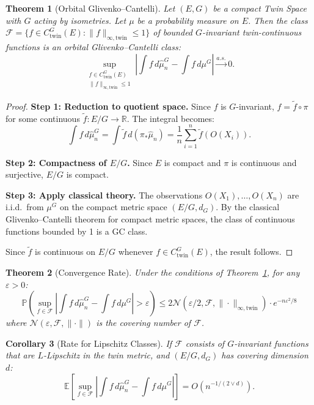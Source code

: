 \documentclass[11pt,twoside,openright]{book}
\theoremstyle{plain}
\newtheorem{theorem}{Theorem}[chapter]
\newtheorem{corollary}[theorem]{Corollary}
\theoremstyle{definition}
\theoremstyle{remark}
\newcommand{\calF}{\mathcal{F}}
\newcommand{\calN}{\mathcal{N}}
\newcommand{\Rd}{\mathbb{R}}
\newcommand{\norm}[1]{\|#1\|}
\newcommand{\abs}[1]{|#1|}
\newcommand{\E}{\mathbb{E}}
\newcommand{\Prob}{\mathbb{P}}
\begin{document}
\begin{theorem}[Orbital Glivenko--Cantelli]
\label{thm:GC}
Let $(E, G)$ be a compact Twin Space with $G$ acting by isometries. Let $\mu$ be a probability measure on $E$. Then the class $\calF = \{f \in C_{\text{twin}}^G(E) : \norm{f}_{\infty,\text{twin}} \leq 1\}$ of bounded $G$-invariant twin-continuous functions is an orbital Glivenko--Cantelli class:
\[
\sup_{\substack{f \in C_{\text{twin}}^G(E)\\ \norm{f}_{\infty,\text{twin}} \leq 1}} \abs{\int f \, d\hat{\mu}_n^G - \int f \, d\mu^G} \xrightarrow{a.s.} 0.
\]
\end{theorem}

\begin{proof}
\textbf{Step 1: Reduction to quotient space.} Since $f$ is $G$-invariant, $f = \tilde{f} \circ \pi$ for some continuous $\tilde{f} : E/G \to \Rd$. The integral becomes:
\[
\int f \, d\hat{\mu}_n^G = \int \tilde{f} \, d(\pi_* \hat{\mu}_n) = \frac{1}{n} \sum_{i=1}^n \tilde{f}(O(X_i)).
\]

\textbf{Step 2: Compactness of $E/G$.} Since $E$ is compact and $\pi$ is continuous and surjective, $E/G$ is compact.

\textbf{Step 3: Apply classical theory.} The observations $O(X_1), \ldots, O(X_n)$ are i.i.d.\ from $\mu^G$ on the compact metric space $(E/G, d_G)$. By the classical Glivenko--Cantelli theorem for compact metric spaces, the class of continuous functions bounded by 1 is a GC class.

Since $\tilde{f}$ is continuous on $E/G$ whenever $f \in C_{\text{twin}}^G(E)$, the result follows.
\end{proof}

\begin{theorem}[Convergence Rate]
\label{thm:GC-rate}
Under the conditions of Theorem~\ref{thm:GC}, for any $\varepsilon > 0$:
\[
\Prob\left(\sup_{f \in \calF} \abs{\int f \, d\hat{\mu}_n^G - \int f \, d\mu^G} > \varepsilon\right) \leq 2\calN(\varepsilon/2, \calF, \norm{\cdot}_{\infty,\text{twin}}) \cdot e^{-n\varepsilon^2/8}
\]
where $\calN(\varepsilon, \calF, \norm{\cdot})$ is the covering number of $\calF$.
\end{theorem}

\begin{corollary}[Rate for Lipschitz Classes]
If $\calF$ consists of $G$-invariant functions that are $L$-Lipschitz in the twin metric, and $(E/G, d_G)$ has covering dimension $d$:
\[
\E\left[\sup_{f \in \calF} \abs{\int f \, d\hat{\mu}_n^G - \int f \, d\mu^G}\right] = O(n^{-1/(2 \vee d)}).
\]
\end{corollary}
\end{document}
